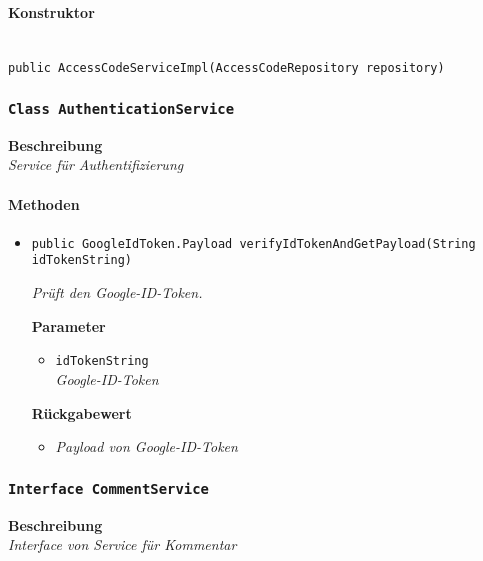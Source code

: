      \paragraph*{Konstruktor}\mbox{} \\
     \texttt{public AccessCodeServiceImpl(AccessCodeRepository repository)}
     \subsubsection{\texttt{Class AuthenticationService}}
     \textbf{Beschreibung} \\
     \textit{Service für Authentifizierung}
     \paragraph*{Methoden}
     \begin{itemize}
     	\item{\texttt{public GoogleIdToken.Payload verifyIdTokenAndGetPayload(String idTokenString)}}
     	
     	\textit{Prüft den Google-ID-Token.}
     	
     	\textbf{Parameter}
     	\begin{itemize}
     		\item\texttt{idTokenString}\\
     		\textit{Google-ID-Token}
     	\end{itemize}
     	
     	\textbf{Rückgabewert}
     	\begin{itemize}
     		\item\textit{Payload von Google-ID-Token}
     	\end{itemize}
     \end{itemize}
 
     \subsubsection{\texttt{Interface CommentService}}
     \textbf{Beschreibung} \\
     \textit{Interface von Service für Kommentar}
